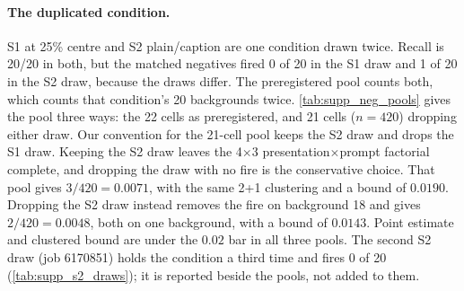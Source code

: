\SuppNegFireTable

\paragraph{The duplicated condition.}
S1 at 25\% centre and S2 plain/caption are one condition drawn twice. Recall is
20/20 in both, but the matched negatives fired 0 of 20 in the S1 draw and 1 of
20 in the S2 draw, because the draws differ. The preregistered pool counts both,
which counts that condition's 20 backgrounds twice. \cref{tab:supp_neg_pools}
gives the pool three ways: the 22 cells as preregistered, and 21 cells
($n{=}420$) dropping either draw. Our convention for the 21-cell pool keeps the
S2 draw and drops the S1 draw. Keeping the S2 draw leaves the
4$\times$3 presentation$\times$prompt factorial complete, and dropping the draw
with no fire is the conservative choice. That pool gives $3/420 = 0.0071$, with
the same 2+1 clustering and a bound of $0.0190$. Dropping the S2 draw instead
removes the fire on background 18 and gives $2/420 = 0.0048$, both on one
background, with a bound of $0.0143$. Point estimate and clustered bound are
under the $0.02$ bar in all three pools. The second S2 draw (job 6170851) holds the
condition a third time and fires 0 of 20 (\cref{tab:supp_s2_draws}); it is reported beside
the pools, not added to them.

